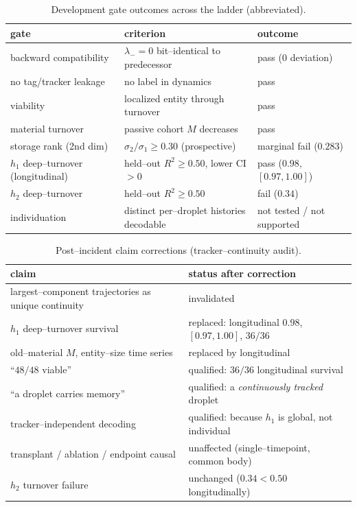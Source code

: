 \documentclass[11pt]{article}
\begin{document}
\begin{table}[t]\centering\small
\caption{Development gate outcomes across the ladder (abbreviated).}
\label{tab:gates}
\begin{tabular}{@{}lll@{}}\toprule
gate & criterion & outcome\\\midrule
backward compatibility & $\lambda_-{=}0$ bit--identical to predecessor & pass ($0$ deviation)\\
no tag/tracker leakage & no label in dynamics & pass\\
viability & localized entity through turnover & pass\\
material turnover & passive cohort $M$ decreases & pass\\
storage rank (2nd dim) & $\sigma_2/\sigma_1 \ge 0.30$ (prospective) & marginal fail ($0.283$)\\
$h_1$ deep--turnover (longitudinal) & held--out $R^2\ge0.50$, lower CI${>}0$ & pass ($0.98$, $[0.97,1.00]$)\\
$h_2$ deep--turnover & held--out $R^2\ge0.50$ & fail ($0.34$)\\
individuation & distinct per--droplet histories decodable & not tested / not supported\\\bottomrule
\end{tabular}
\end{table}
\begin{table}[t]\centering\small
\caption{Post--incident claim corrections (tracker--continuity audit).}
\label{tab:corrections}
\begin{tabular}{@{}ll@{}}\toprule
claim & status after correction\\\midrule
largest--component trajectories as unique continuity & invalidated\\
$h_1$ deep--turnover survival & replaced: longitudinal $0.98$, $[0.97,1.00]$, $36/36$\\
old--material $M$, entity--size time series & replaced by longitudinal\\
``$48/48$ viable'' & qualified: $36/36$ longitudinal survival\\
``a droplet carries memory'' & qualified: a \emph{continuously tracked} droplet\\
tracker--independent decoding & qualified: because $h_1$ is global, not individual\\
transplant / ablation / endpoint causal & unaffected (single--timepoint, common body)\\
$h_2$ turnover failure & unchanged ($0.34<0.50$ longitudinally)\\\bottomrule
\end{tabular}
\end{table}
\end{document}
